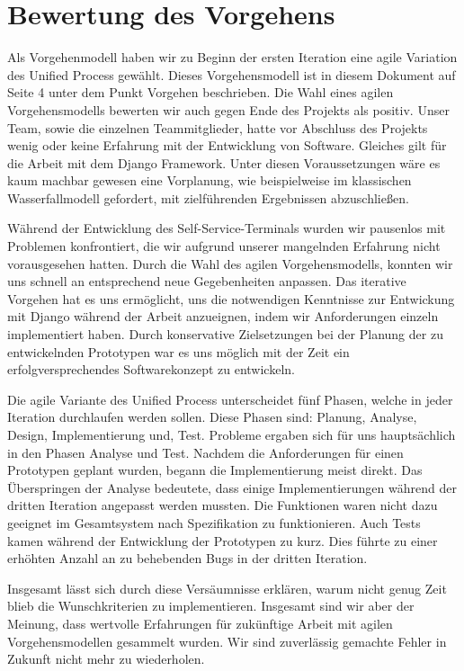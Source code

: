 \section{Bewertung des Vorgehens}

Als Vorgehenmodell haben wir zu Beginn der ersten Iteration eine agile Variation des Unified Process gewählt. Dieses Vorgehensmodell ist in diesem Dokument auf Seite 4 unter dem Punkt  \glqq Vorgehen\grqq{} beschrieben. Die Wahl eines agilen Vorgehensmodells bewerten wir auch gegen Ende des Projekts als positiv. Unser Team, sowie die einzelnen Teammitglieder, hatte vor Abschluss des Projekts wenig oder keine Erfahrung mit der Entwicklung von Software. Gleiches gilt für die Arbeit mit dem Django Framework. Unter diesen Voraussetzungen wäre es kaum machbar gewesen eine Vorplanung, wie beispielweise im klassischen Wasserfallmodell gefordert, mit zielführenden Ergebnissen abzuschließen. \par
\noindent Während der Entwicklung des Self-Service-Terminals wurden wir pausenlos mit Problemen konfrontiert, die wir aufgrund unserer mangelnden Erfahrung nicht vorausgesehen hatten. Durch die Wahl des agilen Vorgehensmodells, konnten wir uns schnell an entsprechend neue Gegebenheiten anpassen. Das iterative Vorgehen hat es uns ermöglicht, uns die notwendigen Kenntnisse zur Entwickung mit Django während der Arbeit anzueignen, indem wir Anforderungen einzeln implementiert haben. Durch konservative Zielsetzungen bei der Planung der zu entwickelnden Prototypen war es uns möglich mit der Zeit ein erfolgversprechendes Softwarekonzept zu entwickeln.\par
\noindent Die agile Variante des Unified Process unterscheidet fünf Phasen, welche in jeder Iteration durchlaufen werden sollen. Diese Phasen sind: \glqq Planung\grqq{}, \glqq Analyse\grqq{}, \glqq Design\grqq{}, \glqq Implementierung\grqq{} und, \glqq Test\grqq{}. Probleme ergaben sich für uns hauptsächlich in den Phasen \glqq Analyse\grqq{} und \glqq Test\grqq{}. Nachdem die Anforderungen für einen Prototypen geplant wurden, begann die Implementierung meist direkt. Das Überspringen der Analyse bedeutete, dass einige Implementierungen während der dritten Iteration angepasst werden mussten. Die Funktionen waren nicht dazu geeignet im Gesamtsystem nach Spezifikation zu funktionieren. Auch Tests kamen während der Entwicklung der Prototypen zu kurz. Dies führte zu einer erhöhten Anzahl an zu behebenden Bugs in der dritten Iteration.\par
\noindent Insgesamt lässt sich durch diese Versäumnisse erklären, warum nicht genug Zeit blieb die Wunschkriterien zu implementieren. Insgesamt sind wir aber der Meinung, dass wertvolle Erfahrungen für zukünftige Arbeit mit agilen Vorgehensmodellen gesammelt wurden. Wir sind zuverlässig gemachte Fehler in Zukunft nicht mehr zu wiederholen.

